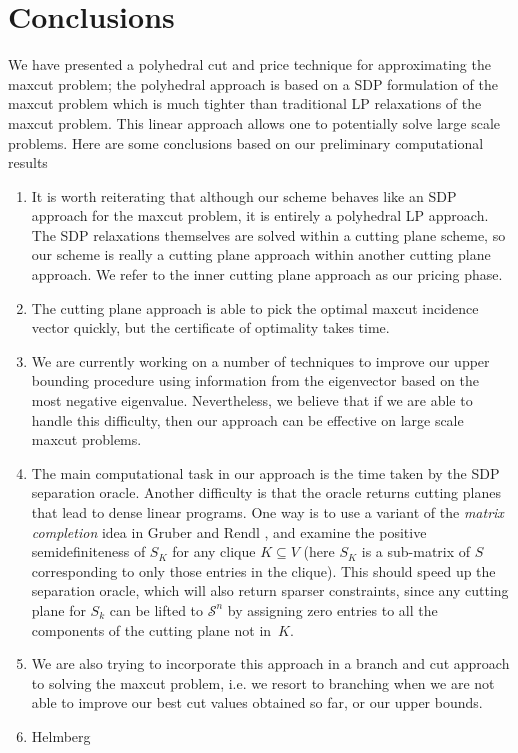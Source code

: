 \documentclass[12pt]{article}
\begin{document}
\section{Conclusions}
\label{maxcut_conclusions} We have presented a polyhedral cut and
price technique for approximating the maxcut problem; the
polyhedral approach is based on a SDP formulation of the maxcut
problem which is much tighter than traditional LP relaxations of
the maxcut problem. This linear approach allows one to potentially
solve large scale problems. Here are some conclusions based on our
preliminary computational results
\begin{enumerate}
\item It is worth reiterating that although our scheme behaves
like an SDP approach for the maxcut problem, it is entirely a
polyhedral LP approach. The SDP relaxations themselves are solved
within a cutting plane scheme, so our scheme is really a cutting
plane approach within another cutting plane approach. We refer to
the inner cutting plane approach as our pricing phase. \item The
cutting plane approach is able to pick the optimal maxcut
incidence vector quickly, but the certificate of optimality takes
time. \item We are currently working on a number of techniques to
improve our upper bounding procedure using information from the
eigenvector based on the most negative eigenvalue. Nevertheless,
we believe that if we are able to handle this difficulty, then our
approach can be effective on large scale maxcut problems. \item
The main computational task in our approach is the time taken by
the SDP separation oracle. Another difficulty is that the oracle
returns cutting planes that lead to dense linear programs. One way
is to use a variant of the {\em matrix completion} idea in Gruber
and Rendl \cite{gruber3}, and examine the positive
semidefiniteness of $S_K$ for any clique $K \subseteq V$ (here
$S_K$ is a sub-matrix of $S$ corresponding to only those entries
in the clique). This should speed up the separation oracle, which
will also return sparser constraints, since any cutting plane for
$S_k$ can be lifted to $\mathcal{S}^n$ by assigning zero entries
to all the components of the cutting plane not in~$K$. \item We
are also trying to incorporate this approach in a branch and cut
approach to solving the maxcut problem, i.e. we resort to
branching when we are not able to improve our best cut values
obtained so far, or our upper bounds. \item Helmberg

\end{enumerate}
\end{document}
